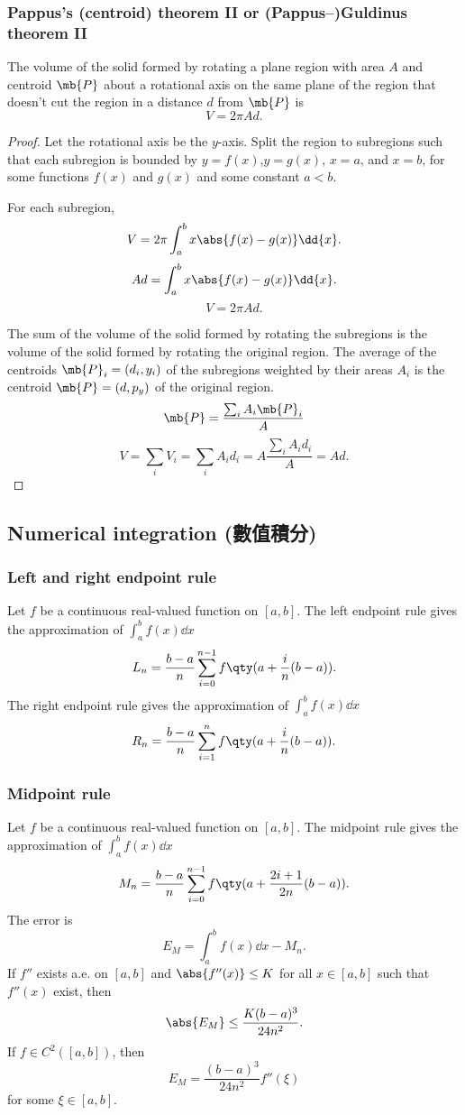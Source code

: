 \subsubsection{Pappus's (centroid) theorem II or (Pappus–)Guldinus theorem II}
The volume of the solid formed by rotating a plane region with area $A$ and centroid $\mb{P}$ about a rotational axis on the same plane of the region that doesn't cut the region in a distance $d$ from $\mb{P}$ is
\[V=2\pi Ad.\]
\begin{proof}
Let the rotational axis be the $y$-axis. Split the region to subregions such that each subregion is bounded by $y=f(x)$,$y=g(x)$, $x=a$, and $x=b$, for some functions $f(x)$ and $g(x)$ and some constant $a<b$.

For each subregion,
\[V=2\pi\int_a^bx\abs{f(x)-g(x)}\dd{x}.\]
\[Ad=\int_a^bx\abs{f(x)-g(x)}\dd{x}.\]
\[V=2\pi Ad.\]

The sum of the volume of the solid formed by rotating the subregions is the volume of the solid formed by rotating the original region. The average of the centroids $\mb{P}_i=(d_i,y_i)$ of the subregions weighted by their areas $A_i$ is the centroid $\mb{P}=(d,p_y)$ of the original region.
\[\mb{P}=\frac{\sum_iA_i\mb{P}_i}{A}\]
\[V=\sum_iV_i=\sum_iA_id_i=A\frac{\sum_iA_id_i}{A}=Ad.\]
\end{proof}
\subsection{Numerical integration (數值積分)}
\subsubsection{Left and right endpoint rule}
Let $f$ be a continuous real-valued function on $[a,b]$. The left endpoint rule gives the approximation of $\int_a^bf(x)\dd{x}$
\[L_n=\frac{b-a}{n}\sum_{i=0}^{n-1}f\qty(a+\frac{i}{n}(b-a)).\]
The right endpoint rule gives the approximation of $\int_a^bf(x)\dd{x}$
\[R_n=\frac{b-a}{n}\sum_{i=1}^nf\qty(a+\frac{i}{n}(b-a)).\]
\subsubsection{Midpoint rule}
Let $f$ be a continuous real-valued function on $[a,b]$. The midpoint rule gives the approximation of $\int_a^bf(x)\dd{x}$
\[M_n=\frac{b-a}{n}\sum_{i=0}^{n-1}f\qty(a+\frac{2i+1}{2n}(b-a)).\]
The error is
\[E_M=\int_a^bf(x)\dd{x}-M_n.\]
If $f''$ exists a.e. on $[a,b]$ and $\abs{f''(x)}\leq K$ for all $x\in[a,b]$ such that $f''(x)$ exist, then
\[\abs{E_M}\leq\frac{K(b-a)^3}{24n^2}.\]
If $f\in C^2([a,b])$, then
\[E_M=\frac{(b-a)^3}{24n^2}f''(\xi)\]
for some $\xi\in[a,b]$.
